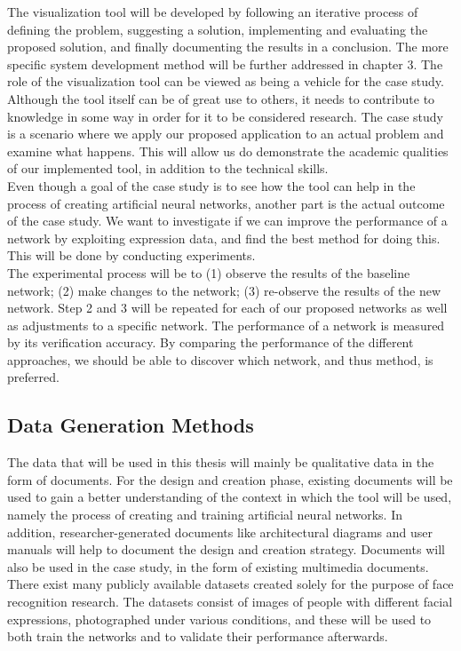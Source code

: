 \noindent The visualization tool will be developed by following an iterative process of defining the problem, suggesting a solution, implementing and evaluating the proposed solution, and finally documenting the results in a conclusion. The more specific system development method will be further addressed in chapter 3. The role of the visualization tool can be viewed as being a vehicle for the case study. Although the tool itself can be of great use to others, it needs to contribute to knowledge in some way in order for it to be considered research. The case study is a scenario where we apply our proposed application to an actual problem and examine what happens. This will allow us do demonstrate the academic qualities of our implemented tool, in addition to the technical skills. \\

\noindent Even though a goal of the case study is to see how the tool can help in the process of creating artificial neural networks, another part is the actual outcome of the case study. We want to investigate if we can improve the performance of a network by exploiting expression data, and find the best method for doing this. This will be done by conducting experiments. \\

\noindent The experimental process will be to (1) observe the results of the baseline network; (2) make changes to the network; (3) re-observe the results of the new network. Step 2 and 3 will be repeated for each of our proposed networks as well as adjustments to a specific network. The performance of a network is measured by its verification accuracy. By comparing the performance of the different approaches, we should be able to discover which network, and thus method, is preferred.

\subsection{Data Generation Methods}

The data that will be used in this thesis will mainly be qualitative data in the form of documents. For the design and creation phase, existing documents will be used to gain a better understanding of the context in which the tool will be used, namely the process of creating and training artificial neural networks. In addition, researcher-generated documents like architectural diagrams and user manuals will help to document the design and creation strategy. Documents will also be used in the case study, in the form of existing multimedia documents. There exist many publicly available datasets created solely for the purpose of face recognition research. The datasets consist of images of people with different facial expressions, photographed under various conditions, and these will be used to both train the networks and to validate their performance afterwards.

